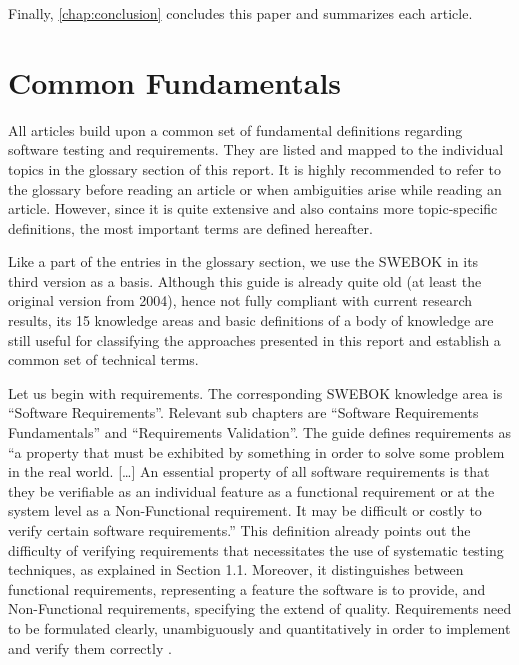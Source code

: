 Finally, \autoref{chap:conclusion} concludes this paper and summarizes each article.

\section{Common Fundamentals}\label{sec:introduction_common_fundamentals}
All articles build upon a common set of fundamental definitions regarding software testing and requirements.
They are listed and mapped to the individual topics in the glossary section of this report.
It is highly recommended to refer to the glossary before reading an article or when ambiguities arise while reading an article.
However, since it is quite extensive and also contains more topic-specific definitions, the most important terms are defined hereafter.

Like a part of the entries in the glossary section, we use the SWEBOK in its third version as a basis.
Although this guide is already quite old (at least the original version from 2004), hence not fully compliant with current research results, its 15 knowledge areas and basic definitions of a body of knowledge are still useful for classifying the approaches presented in this report and establish a common set of technical terms.

Let us begin with requirements.
The corresponding SWEBOK knowledge area is \enquote{Software Requirements}.
Relevant sub chapters are \enquote{Software Requirements Fundamentals} and \enquote{Requirements Validation}.
The guide defines requirements as \enquote{a property that must be exhibited by something in order to solve some problem in the real world. [\ldots]
An essential property of all software requirements is that they be verifiable as an individual feature as a functional requirement or at the system level as a Non-Functional requirement.
It may be difficult or costly to verify certain software requirements.} \cite{SWEBOK}
This definition already points out the difficulty of verifying requirements that necessitates the use of systematic testing techniques, as explained in Section 1.1.
Moreover, it distinguishes between functional requirements, representing a feature the software is to provide, and Non-Functional requirements, specifying the extend of quality.
Requirements need to be formulated clearly, unambiguously and quantitatively in order to implement and verify them correctly \cite{SWEBOK}.

